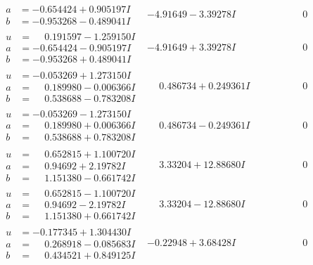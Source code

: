\documentclass[1p]{elsarticle_modified}
\theoremstyle{definition}
\begin{document}
$$\begin{array}{c|c|c}
\begin{aligned}
a &= -0.654424 + 0.905197 I \\
b &= -0.953268 - 0.489041 I\end{aligned}
 & -4.91649 - 3.39278 I & \phantom{-0.000000 } 0 \\ \hline\begin{aligned}
u &= \phantom{-}0.191597 - 1.259150 I \\
a &= -0.654424 - 0.905197 I \\
b &= -0.953268 + 0.489041 I\end{aligned}
 & -4.91649 + 3.39278 I & \phantom{-0.000000 } 0 \\ \hline\begin{aligned}
u &= -0.053269 + 1.273150 I \\
a &= \phantom{-}0.189980 - 0.006366 I \\
b &= \phantom{-}0.538688 - 0.783208 I\end{aligned}
 & \phantom{-}0.486734 + 0.249361 I & \phantom{-0.000000 } 0 \\ \hline\begin{aligned}
u &= -0.053269 - 1.273150 I \\
a &= \phantom{-}0.189980 + 0.006366 I \\
b &= \phantom{-}0.538688 + 0.783208 I\end{aligned}
 & \phantom{-}0.486734 - 0.249361 I & \phantom{-0.000000 } 0 \\ \hline\begin{aligned}
u &= \phantom{-}0.652815 + 1.100720 I \\
a &= \phantom{-}0.94692 + 2.19782 I \\
b &= \phantom{-}1.151380 - 0.661742 I\end{aligned}
 & \phantom{-}3.33204 + 12.88680 I & \phantom{-0.000000 } 0 \\ \hline\begin{aligned}
u &= \phantom{-}0.652815 - 1.100720 I \\
a &= \phantom{-}0.94692 - 2.19782 I \\
b &= \phantom{-}1.151380 + 0.661742 I\end{aligned}
 & \phantom{-}3.33204 - 12.88680 I & \phantom{-0.000000 } 0 \\ \hline\begin{aligned}
u &= -0.177345 + 1.304430 I \\
a &= \phantom{-}0.268918 - 0.085683 I \\
b &= \phantom{-}0.434521 + 0.849125 I\end{aligned}
 & -0.22948 + 3.68428 I & \phantom{-0.000000 } 0 \\ \hline\begin{aligned}

\end{aligned}
\end{array}$$
\end{document}
